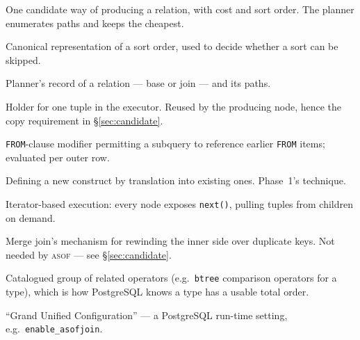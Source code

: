 \documentclass[11pt,a4paper]{report}
\theoremstyle{definition}
\theoremstyle{plain}
\newcommand{\code}[1]{\texttt{\small #1}}
\newcommand{\asof}{{\normalfont\scshape asof}}
\begin{document}
\begin{description}[leftmargin=*,style=nextline,font=\normalfont\bfseries\ttfamily]
\item[Path] One candidate way of producing a relation, with cost and sort order. The
planner enumerates paths and keeps the cheapest.
\item[PathKey] Canonical representation of a sort order, used to decide whether a sort can
be skipped.
\item[RelOptInfo] Planner's record of a relation --- base or join --- and its paths.
\item[TupleTableSlot] Holder for one tuple in the executor. Reused by the producing node,
hence the copy requirement in \S\ref{sec:candidate}.
\item[LATERAL] \code{FROM}-clause modifier permitting a subquery to reference earlier
\code{FROM} items; evaluated per outer row.
\item[Desugaring] Defining a new construct by translation into existing ones. Phase~1's
technique.
\item[Volcano model] Iterator-based execution: every node exposes \code{next()}, pulling
tuples from children on demand.
\item[Mark/restore] Merge join's mechanism for rewinding the inner side over duplicate
keys. Not needed by \asof{} --- see \S\ref{sec:candidate}.
\item[opfamily] Catalogued group of related operators (e.g.\ \code{btree} comparison
operators for a type), which is how PostgreSQL knows a type has a usable total order.
\item[GUC] ``Grand Unified Configuration'' --- a PostgreSQL run-time setting, e.g.\
\code{enable\_asofjoin}.
\end{description}
\end{document}
